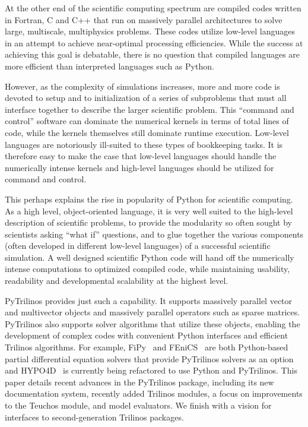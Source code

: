 \documentclass[11pt]{article}
\begin{document}
At the other end of the scientific computing spectrum are compiled codes written in Fortran, C and C++ that run on massively parallel architectures to solve large, multiscale, multiphysics problems.  These codes utilize low-level languages in an attempt to achieve near-optimal processing efficiencies.  While the success at achieving this goal is debatable, there is no question that compiled languages are more efficient than interpreted languages such as Python.

However, as the complexity of simulations increases, more and more code is devoted to setup and to initialization of a series of subproblems that must all interface together to describe the larger scientific problem.  This ``command and control'' software can dominate the numerical kernels in terms of total lines of code, while the kernels themselves still dominate runtime execution.  Low-level languages are notoriously ill-suited to these types of bookkeeping tasks.  It is therefore easy to make the case that low-level languages should handle the numerically intense kernels and high-level languages should be utilized for command and control.

This perhaps explains the rise in popularity of Python for scientific computing.  As a high level, object-oriented language, it is very well suited to the high-level description of scientific problems, to provide the modularity so often sought by scientists asking ``what if'' questions, and to glue together the various components (often developed in different low-level languages) of a successful scientific simulation.  A well designed scientific Python code will hand off the numerically intense computations to optimized compiled code, while maintaining usability, readability and developmental scalability at the highest level.

PyTrilinos provides just such a capability.  It supports massively parallel vector and multivector objects and massively parallel operators such as sparse matrices.  PyTrilinos also supports solver algorithms that utilize these objects, enabling the development of complex codes with convenient Python interfaces and efficient Trilinos algorithms.  For example, FiPy~\cite{FiPy,FiPy_Site} and FEniCS~\cite{FEniCS} are both Python-based partial differential equation solvers that provide PyTrilinos solvers as an option and HYPO4D~\cite{HYPO4D} is currently being refactored to use Python and PyTrilinos.  This paper details recent advances in the PyTrilinos package, including its new documentation system, recently added Trilinos modules, a focus on improvements to the Teuchos module, and model evaluators.  We finish with a vision for interfaces to second-generation Trilinos packages.
\end{document}

